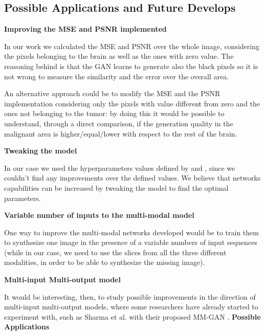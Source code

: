 \subsection{Possible Applications and Future Develops}
\label{sec:possible_applications}
\vspace{6mm} 
\noindent\textbf{Improving the MSE and PSNR implemented }

\vspace{2mm}
\noindent 
In our work we calculated the MSE and PSNR over the whole image, considering the pixels belonging to the brain as well as the ones with zero value. The reasoning behind is that the \ac{GAN} learns to generate also the black pixels so it is not wrong to measure the similarity and the error over the overall area. 

An alternative approach could be to modify the MSE and the PSNR implementation considering only the pixels with value different from zero and the ones not belonging to the tumor: by doing this it would be possible to understand, through a direct comparison, if the generation quality in the malignant area is higher/equal/lower with respect to the rest of the brain.

\vspace{6mm} 
\noindent\textbf{Tweaking the model}

\vspace{2mm}
\noindent 
In our case we used the hyperparameters values defined by \cite{pix2pix} and \cite{migan}, since we couldn't find any improvements over the defined values. We believe that networks capabilities can be increased by tweaking the model to find the optimal parameters. 


\vspace{6mm} 
\noindent\textbf{Variable number of inputs to the multi-modal model}

\vspace{2mm}
\noindent 
One way to improve the multi-modal networks developed would be to train them to synthesize one image in the presence of a variable numbers of input sequences (while in our case, we need to use the slices from all the three different modalities, in order to be able to synthesize the missing image).

\vspace{6mm} 
\noindent\textbf{Multi-input Multi-output model}

\vspace{2mm}
\noindent 
It would be interesting, then, to study possible improvements in the direction of multi-input multi-output models, where some researchers have already started to experiment with, such as Sharma et al. with their proposed MM-GAN \cite{migan}.
\newpage
\vspace{6mm} 
\noindent\textbf{Possible Applications}

